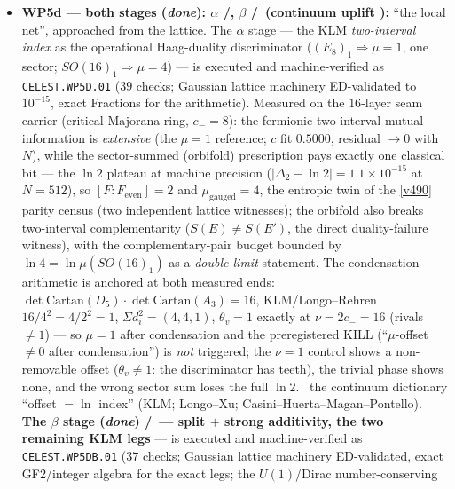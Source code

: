 \documentclass[11pt,a4paper]{article}
\begin{document}
\begin{itemize}
\begin{itemize}
$710955\neq248$; no damping keeps $897266\neq248$); $k$-dial and $D_8$ controls separate honestly
($k{=}2$: $\langle s|s\rangle={+}4$, no ideal in the kernel; $D_8$: one block of four, $h=\tfrac12$).
\mC\ quasi-free extension to the full $*$-algebra; Kac positivity beyond level $2$.
\item \textbf{WP5d --- both stages (\emph{done}): $\alpha$ \mE/\mC, $\beta$ \mE/\mC\ (continuum
uplift \mO):} ``the local net'',
approached from the lattice. The $\alpha$ stage --- the KLM \emph{two-interval index} as the
operational Haag-duality discriminator ($(E_8)_1\Rightarrow\mu{=}1$, one sector;
$SO(16)_1\Rightarrow\mu{=}4$) --- is executed and machine-verified as \texttt{CELEST.WP5D.01}
 ($39$ checks; Gaussian lattice machinery
ED-validated to $10^{-15}$, exact Fractions for the arithmetic). Measured on the $16$-layer seam
carrier (critical Majorana ring, $c_-=8$): the fermionic two-interval mutual information is
\emph{extensive} (the $\mu{=}1$ reference; $c$ fit $0.5000$, residual $\to0$ with $N$), while the
sector-summed (orbifold) prescription pays exactly one classical bit --- the $\ln2$ plateau at
machine precision ($|\Delta_2-\ln2|=1.1\times10^{-15}$ at $N{=}512$), so
$[F:F_{\mathrm{even}}]=2$ and $\mu_{\mathrm{gauged}}=4$, the entropic twin of the \vref{v490}
parity census (two independent lattice witnesses); the orbifold also breaks two-interval
complementarity ($S(E)\neq S(E')$, the direct duality-failure witness), with the complementary-pair
budget bounded by $\ln4=\ln\mu(SO(16)_1)$ as a \emph{double-limit} statement. The condensation
arithmetic is anchored at both measured ends: $\det\mathrm{Cartan}(D_5)\cdot\det\mathrm{Cartan}(A_3)
=16$, KLM/Longo--Rehren $16/4^2=4/2^2=1$, $\Sigma d_i^2=(4,4,1)$, $\theta_v=1$ exactly at
$\nu=2c_-=16$ (rivals $\neq1$) --- so $\mu=1$ after condensation and the preregistered KILL
(``$\mu$-offset $\neq0$ after condensation'') is \emph{not} triggered; the $\nu{=}1$ control shows a
non-removable offset ($\theta_v\neq1$: the discriminator has teeth), the trivial phase shows none,
and the wrong sector sum loses the full $\ln2$. \mC\ the continuum dictionary ``offset $=\ln$
index'' (KLM; Longo--Xu; Casini--Huerta--Magan--Pontello). \textbf{The $\beta$ stage (\emph{done})
\mE/\mC\ --- split $+$ strong additivity, the two remaining KLM legs} --- is executed and
machine-verified as \texttt{CELEST.WP5DB.01}
 ($37$ checks; Gaussian lattice machinery
ED-validated, exact GF2/integer algebra for the exact legs; the $U(1)$/Dirac number-conserving

\end{itemize}
\end{itemize}
\end{document}
